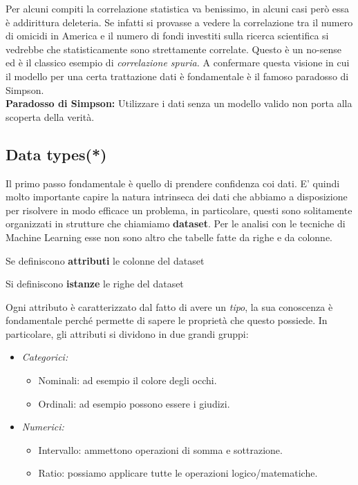 Per alcuni compiti la correlazione statistica va benissimo, in alcuni casi però essa è addirittura deleteria.  Se infatti si provasse a vedere la correlazione tra il numero di omicidi in America e il numero di fondi investiti sulla ricerca scientifica si vedrebbe che statisticamente sono strettamente correlate. Questo è un no-sense ed è il classico esempio di \textit{correlazione spuria.}
A confermare questa visione in cui il modello per una certa trattazione dati è fondamentale è il famoso paradosso di Simpson. \\
\textbf{Paradosso di Simpson:} Utilizzare i dati senza un modello valido non porta alla scoperta della verità.


\subsection{Data types(*)}

Il primo passo fondamentale è quello di prendere confidenza coi dati. E' quindi molto importante capire la natura intrinseca dei dati che abbiamo a disposizione per risolvere in modo efficace un problema, in particolare, questi sono solitamente organizzati in strutture che chiamiamo \textbf{dataset}. Per le analisi con le tecniche di Machine Learning esse non sono altro che tabelle fatte da righe e da colonne.

\begin{defn}
	Se definiscono \textbf{attributi} le colonne del dataset
\end{defn}
\begin{defn}
	Si definiscono \textbf{istanze} le righe del dataset
\end{defn}

Ogni attributo è caratterizzato dal fatto di avere un \textit{tipo}, la sua conoscenza è fondamentale perché  permette di sapere le proprietà che questo possiede.
In particolare, gli attributi si dividono in due grandi gruppi:
\begin{itemize}
	\item \textit{Categorici:}
	\begin{itemize}
		\item Nominali: ad esempio il colore degli occhi.
		\item Ordinali: ad esempio possono essere i giudizi.
	\end{itemize}
	\item \textit{Numerici:}
	\begin{itemize}
		\item Intervallo: ammettono operazioni di somma e sottrazione. 
		\item Ratio: possiamo applicare tutte le operazioni logico/matematiche.
	\end{itemize}
\end{itemize}


